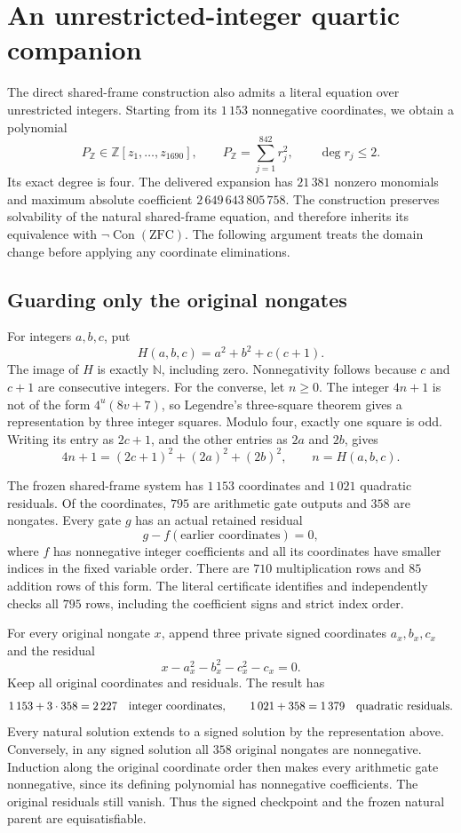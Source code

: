 \section{An unrestricted-integer quartic companion}
\label{sec:integer-companion}

The direct shared-frame construction also admits a literal equation over
unrestricted integers.  Starting from its $1\,153$ nonnegative coordinates,
we obtain a polynomial
\[
 P_{\mathbb Z}\in\mathbb Z[z_1,\ldots,z_{1690}],\qquad
 P_{\mathbb Z}=\sum_{j=1}^{842}r_j^2,
 \qquad \deg r_j\leq 2.
\]
Its exact degree is four.  The delivered expansion has $21\,381$ nonzero
monomials and maximum absolute coefficient $2\,649\,643\,805\,758$.
The construction preserves solvability of the natural shared-frame
equation, and therefore inherits its equivalence with
$\neg\operatorname{Con}(\mathrm{ZFC})$.  The following argument treats the
domain change before applying any coordinate eliminations.

\subsection{Guarding only the original nongates}

For integers $a,b,c$, put
\[
 H(a,b,c)=a^2+b^2+c(c+1).
\]
The image of $H$ is exactly $\mathbb N$, including zero.  Nonnegativity
follows because $c$ and $c+1$ are consecutive integers.  For the converse,
let $n\geq0$.  The integer $4n+1$ is not of the form $4^u(8v+7)$, so
Legendre's three-square theorem gives a representation by three integer
squares.  Modulo four, exactly one square is odd.  Writing its entry as
$2c+1$, and the other entries as $2a$ and $2b$, gives
\[
 4n+1=(2c+1)^2+(2a)^2+(2b)^2,
 \qquad n=H(a,b,c).
\]

The frozen shared-frame system has $1\,153$ coordinates and $1\,021$
quadratic residuals.  Of the coordinates, $795$ are arithmetic gate
outputs and $358$ are nongates.  Every gate $g$ has an actual retained
residual
\[
 g-f(\text{earlier coordinates})=0,
\]
where $f$ has nonnegative integer coefficients and all its coordinates
have smaller indices in the fixed variable order.  There are $710$
multiplication rows and $85$ addition rows of this form.
The literal certificate identifies and independently checks all $795$
rows, including the coefficient signs and strict index order.

For every original nongate $x$, append three private signed coordinates
$a_x,b_x,c_x$ and the residual
\[
 x-a_x^2-b_x^2-c_x^2-c_x=0.
\]
Keep all original coordinates and residuals.  The result has
\[
 1\,153+3\cdot358=2\,227
 \quad\hbox{integer coordinates},\qquad
 1\,021+358=1\,379
 \quad\hbox{quadratic residuals}.
\]
Every natural solution extends to a signed solution by the representation
above.  Conversely, in any signed solution all $358$ original nongates
are nonnegative.  Induction along the original coordinate order then makes
every arithmetic gate nonnegative, since its defining polynomial has
nonnegative coefficients.  The original residuals still vanish.  Thus
the signed checkpoint and the frozen natural parent are equisatisfiable.


